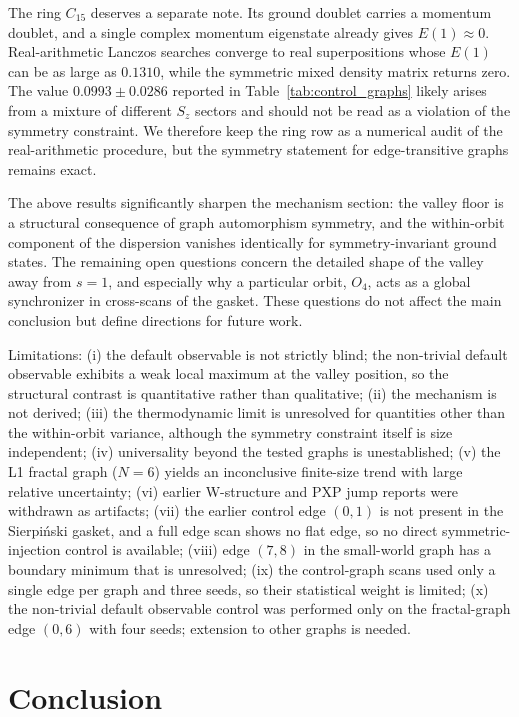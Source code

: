 \documentclass[aps,prb,reprint,superscriptaddress]{revtex4-2}
\begin{document}
The ring $C_{15}$ deserves a separate note. Its ground doublet carries a momentum doublet, and a single complex momentum eigenstate already gives $E(1)\approx0$. Real-arithmetic Lanczos searches converge to real superpositions whose $E(1)$ can be as large as $0.1310$, while the symmetric mixed density matrix returns zero. The value $0.0993\pm0.0286$ reported in Table~\ref{tab:control_graphs} likely arises from a mixture of different $S_z$ sectors and should not be read as a violation of the symmetry constraint. We therefore keep the ring row as a numerical audit of the real-arithmetic procedure, but the symmetry statement for edge-transitive graphs remains exact.

The above results significantly sharpen the mechanism section: the valley floor is a structural consequence of graph automorphism symmetry, and the within-orbit component of the dispersion vanishes identically for symmetry-invariant ground states. The remaining open questions concern the detailed shape of the valley away from $s=1$, and especially why a particular orbit, $O_4$, acts as a global synchronizer in cross-scans of the gasket. These questions do not affect the main conclusion but define directions for future work.

Limitations: (i) the default observable is not strictly blind; the non-trivial default observable exhibits a weak local maximum at the valley position, so the structural contrast is quantitative rather than qualitative; (ii) the mechanism is not derived; (iii) the thermodynamic limit is unresolved for quantities other than the within-orbit variance, although the symmetry constraint itself is size independent; (iv) universality beyond the tested graphs is unestablished; (v) the L1 fractal graph ($N=6$) yields an inconclusive finite-size trend with large relative uncertainty; (vi) earlier W-structure and PXP jump reports were withdrawn as artifacts; (vii) the earlier control edge $(0,1)$ is not present in the Sierpi\'{n}ski gasket, and a full edge scan shows no flat edge, so no direct symmetric-injection control is available; (viii) edge $(7,8)$ in the small-world graph has a boundary minimum that is unresolved; (ix) the control-graph scans used only a single edge per graph and three seeds, so their statistical weight is limited; (x) the non-trivial default observable control was performed only on the fractal-graph edge $(0,6)$ with four seeds; extension to other graphs is needed.

\section{Conclusion}
\end{document}
